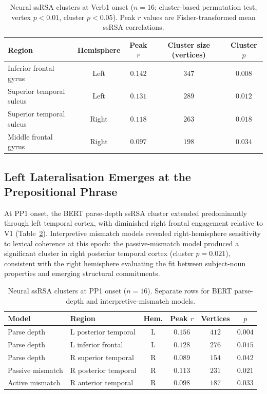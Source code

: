 \documentclass[11pt]{article}
\begin{document}
\begin{table}[H]
\centering
\caption{Neural ssRSA clusters at Verb1 onset ($n = 16$; cluster-based permutation test, vertex $p < 0.01$, cluster $p < 0.05$). Peak $r$ values are Fisher-transformed mean ssRSA correlations.}
\label{tab:neural_v1}
\begin{tabular}{lcccc}
\toprule
Region & Hemisphere & Peak $r$ & Cluster size (vertices) & Cluster $p$ \\
\midrule
Inferior frontal gyrus & Left & $0.142$ & $347$ & $0.008$ \\
Superior temporal sulcus & Left & $0.131$ & $289$ & $0.012$ \\
Superior temporal sulcus & Right & $0.118$ & $263$ & $0.018$ \\
Middle frontal gyrus & Right & $0.097$ & $198$ & $0.034$ \\
\bottomrule
\end{tabular}
\end{table}

\subsection{Left Lateralisation Emerges at the Prepositional Phrase}

At PP1 onset, the BERT parse-depth ssRSA cluster extended predominantly through left temporal cortex, with diminished right frontal engagement relative to V1 (Table~\ref{tab:neural_pp}). Interpretive mismatch models revealed right-hemisphere sensitivity to lexical coherence at this epoch: the passive-mismatch model produced a significant cluster in right posterior temporal cortex (cluster $p = 0.021$), consistent with the right hemisphere evaluating the fit between subject-noun properties and emerging structural commitments.

\begin{table}[H]
\centering
\caption{Neural ssRSA clusters at PP1 onset ($n = 16$). Separate rows for BERT parse-depth and interpretive-mismatch models.}
\label{tab:neural_pp}
\begin{tabular}{llcccc}
\toprule
Model & Region & Hem. & Peak $r$ & Vertices & $p$ \\
\midrule
Parse depth & L posterior temporal & L & $0.156$ & $412$ & $0.004$ \\
Parse depth & L inferior frontal & L & $0.128$ & $276$ & $0.015$ \\
Parse depth & R superior temporal & R & $0.089$ & $154$ & $0.042$ \\
Passive mismatch & R posterior temporal & R & $0.113$ & $231$ & $0.021$ \\
Active mismatch & R anterior temporal & R & $0.098$ & $187$ & $0.033$ \\
\bottomrule
\end{tabular}
\end{table}
\end{document}
